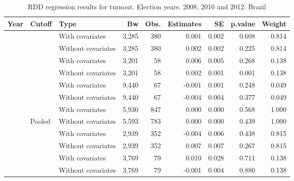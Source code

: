 \documentclass[
  12pt,
]{article}
\begin{document}
\begin{table}[H]

\caption{\label{tab:reg.part}RDD regression results for turnout. Election years: 2008, 2010 and 2012. Brazil}
\centering
\begin{tabular}[t]{lllrrrrrr}
\toprule
Year & Cutoff & Type & Bw & Obs. & Estimates & SE & p.value & Weight\\
\midrule
 &  & With covariates & 3,285 & 380 & 0.001 & 0.002 & 0.608 & 0.814\\


 & \multirow{-2}{*}{\raggedright\arraybackslash 20000} & Without covariates & 3,285 & 380 & 0.002 & 0.002 & 0.225 & 0.814\\


 &  & With covariates & 3,201 & 58 & 0.006 & 0.005 & 0.268 & 0.138\\


 & \multirow{-2}{*}{\raggedright\arraybackslash 40000} & Without covariates & 3,201 & 58 & 0.002 & 0.001 & 0.001 & 0.138\\


 &  & With covariates & 9,440 & 67 & -0.001 & 0.001 & 0.248 & 0.049\\


 & \multirow{-2}{*}{\raggedright\arraybackslash 60000} & Without covariates & 9,440 & 67 & -0.004 & 0.004 & 0.377 & 0.049\\


 &  & With covariates & 5,930 & 847 & 0.000 & 0.000 & 0.568 & 1.000\\


\multirow{-8}{*}{\raggedright\arraybackslash 2008} & \multirow{-2}{*}{\raggedright\arraybackslash Pooled} & Without covariates & 5,593 & 783 & 0.000 & 0.000 & 0.439 & 1.000\\

\cmidrule{1-9}
 &  & With covariates & 2,939 & 352 & -0.004 & 0.006 & 0.438 & 0.815\\


 & \multirow{-2}{*}{\raggedright\arraybackslash 20000} & Without covariates & 2,939 & 352 & 0.007 & 0.007 & 0.267 & 0.815\\


 &  & With covariates & 3,769 & 79 & 0.010 & 0.028 & 0.711 & 0.138\\


 & \multirow{-2}{*}{\raggedright\arraybackslash 40000} & Without covariates & 3,769 & 79 & -0.001 & 0.004 & 0.880 & 0.138\\



\end{tabular}
\end{table}
\end{document}
